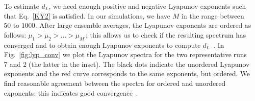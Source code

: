 \documentclass[11pt]{amsart}
\theoremstyle{definition}
\numberwithin{equation}{section}
\numberwithin{equation}{section}
\begin{document}
\par\vspace{3mm}\noindent
To estimate $d_{L}$, we need enough positive and negative Lyapunov exponents such that Eq.~\eqref{KY2} is satisfied. In our simulations, we have $M$ in the range between $50$ to $1000$. After large ensemble averages, the Lyapunov exponents are ordered as follows: $\mu_{1}>\mu_{2}>\ldots>\mu_{M}$\,; this allows us to check if the resulting spectrum has converged and to obtain enough Lyapunov exponents to compute $d_{L}$~\cite{BC2019PRE}. In Fig.~\ref{fig:lyp_conv} we plot the Lyapunov spectra for the two representative runs 7 and 2 (the latter in the inset). The black dots indicate the unordered Lyapunov exponents and the red curve corresponds to the same exponents, but ordered. We find reasonable agreement between the spectra for ordered and unordered exponents; this indicates good convergence~\cite{BC2019PRE}. 
\end{document}
